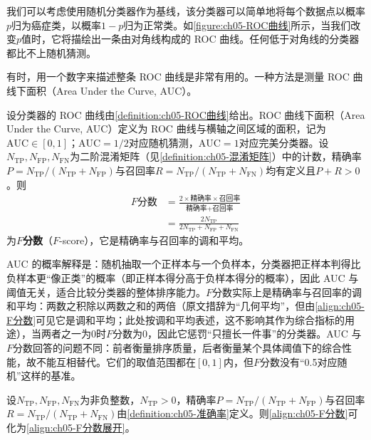 \documentclass[../../main.tex]{subfiles}
\begin{document}
我们可以考虑使用随机分类器作为基线，该分类器可以简单地将每个数据点以概率$p$归为癌症类，以概率$1-p$归为正常类。如\cref{figure:ch05-ROC曲线}所示，当我们改变$p$值时，它将描绘出一条由对角线构成的 ROC 曲线。任何低于对角线的分类器都比不上随机猜测。

有时，用一个数字来描述整条 ROC 曲线是非常有用的。一种方法是测量 ROC 曲线下面积（Area Under the Curve, AUC）。

\begin{definition}[AUC 与 $F$ 分数]\label{definition:ch05-AUC与F分数}
设分类器的 ROC 曲线由\cref{definition:ch05-ROC曲线}给出。ROC 曲线下面积（Area Under the Curve, AUC）定义为 ROC 曲线与横轴之间区域的面积，记为$\mathrm{AUC}\in[0,1]$；$\mathrm{AUC}=1/2$对应随机猜测，$\mathrm{AUC}=1$对应完美分类器。设$N_{\mathrm{TP}},N_{\mathrm{FP}},N_{\mathrm{FN}}$为二阶混淆矩阵（见\cref{definition:ch05-混淆矩阵}）中的计数，精确率$P=N_{\mathrm{TP}}/(N_{\mathrm{TP}}+N_{\mathrm{FP}})$与召回率$R=N_{\mathrm{TP}}/(N_{\mathrm{TP}}+N_{\mathrm{FN}})$均有定义且$P+R>0$。则
\begin{align}
  F\text{分数}&=\frac{2\times\text{精确率}\times\text{召回率}}{\text{精确率}+\text{召回率}}
  \label{align:ch05-F分数}\\
  &=\frac{2N_{\mathrm{TP}}}{2N_{\mathrm{TP}}+N_{\mathrm{FP}}+N_{\mathrm{FN}}}
  \label{align:ch05-F分数展开}
\end{align}
为\textbf{$F$分数}（$F$-score），它是精确率与召回率的调和平均。
\end{definition}

\begin{remark}
AUC 的概率解释是：随机抽取一个正样本与一个负样本，分类器把正样本判得比负样本更“像正类”的概率（即正样本得分高于负样本得分的概率），因此 AUC 与阈值无关，适合比较分类器的整体排序能力。$F$分数实际上是精确率与召回率的调和平均：两数之积除以两数之和的两倍（原文措辞为“几何平均”，但由\eqref{align:ch05-F分数}可见它是调和平均；此处按调和平均表述，这不影响其作为综合指标的用途），当两者之一为0时$F$分数为0，因此它惩罚“只擅长一件事”的分类器。AUC 与$F$分数回答的问题不同：前者衡量排序质量，后者衡量某个具体阈值下的综合性能，故不能互相替代。它们的取值范围都在$[0,1]$内，但$F$分数没有“0.5对应随机”这样的基准。
\end{remark}

\begin{proposition}[$F$ 分数的显式形式]\label{proposition:ch05-F分数}
设$N_{\mathrm{TP}},N_{\mathrm{FP}},N_{\mathrm{FN}}$为非负整数，$N_{\mathrm{TP}}>0$，精确率$P=N_{\mathrm{TP}}/(N_{\mathrm{TP}}+N_{\mathrm{FP}})$与召回率$R=N_{\mathrm{TP}}/(N_{\mathrm{TP}}+N_{\mathrm{FN}})$由\cref{definition:ch05-准确率}定义。则\eqref{align:ch05-F分数}可化为\eqref{align:ch05-F分数展开}。
\end{proposition}
\end{document}
